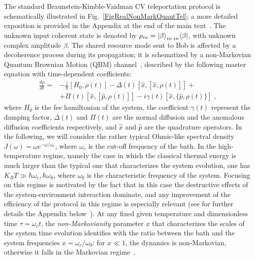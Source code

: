 \documentclass[prl,twocolumn,aps,floatfix,showpacs,tightenlines,superscriptaddress,amsmath,amssymb,amsfonts,10pt]{revtex4-1}
\begin{document}
The standard Braunstein-Kimble-Vaidman CV teleportation protocol is schematically illustrated in Fig.~\ref{FigRealNonMarkQuantTel}; a more detailed exposition is provided in the Appendix at the end of the main text~\cite{SuppMat}. The unknown input coherent state is denoted by  $\rho_{in}=\ket{\beta}_{in}\prescript{}{in}{\bra{\beta}}$, with unknown complex amplitude $\beta$. The shared resource mode sent to Bob is affected by a decoherence process during its propagation; it is schematized by a non-Markovian Quantum Brownian Motion (QBM) channel~\cite{PhysRevD.45.2843, PhysRevA.67.042108, PhysRevA.70.032113}, described by the following master equation with time-dependent coefficients:
\begin{align}
\label{QBMEq}
\frac{d\rho}{dt} = & -\frac{i}{\hbar} [H_0,\rho(t)]-\Delta(t)[\hat{x},[\hat{x},\rho(t)]] + \nonumber \\ & +
 \Pi(t)[\hat{x},[\hat{p},\rho(t)]] - i\gamma(t)[\hat{x},\{\hat{p},\rho(t)\}]\;,
\end{align}
where $H_0$ is the fee hamiltonian of the system, the coefficient $\gamma(t)$ represent the damping factor, $\Delta(t)$ and $\Pi(t)$ are the normal diffusion and the anomalous diffusion coefficients respectively, and $\hat{x}$ and $\hat{p}$ are the quadrature operators.
In the following, we will consider the rather typical Ohmic-like spectral density $J(\omega)=\omega e^{-\omega/\omega_c}$, where $\omega_c$ is the cut-off frequency of the bath. In the high-temperature regime, namely the case in which the classical thermal energy is much
larger than the typical one that characterizes the system evolution, one has $K_B T \gg \hbar \omega_c, \hbar \omega_0$, where $\omega_0$ is the characteristic frequency of the system. Focusing on this regime is motivated by the fact that in this case the destructive effects of the system-environment interaction dominate, and any improvement of the efficiency of the protocol in this regime is especially relevant (see for further details the Appendix below~\cite{SuppMat}). At any fixed given temperature and dimensionless time $\tau=\omega_c t$, the {\em non-Markovianity} parameter $x$ that characterizes the scales of the system time evolution identifies with the ratio between the bath and the system frequencies $x=\omega_c/\omega_0$:
for $x\ll 1$, the dynamics is non-Markovian, otherwise it falls in the Markovian regime~\cite{PhysRevA.70.032113, TorreAsym2017}.
\end{document}
